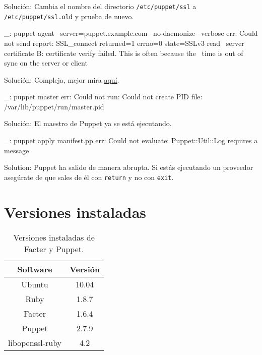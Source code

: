 Solución: Cambia el nombre del directorio \texttt{/etc/puppet/ssl} a \texttt{/etc/puppet/ssl.old} y prueba de nuevo.

\begin{bashcode}
_: puppet agent --server=puppet.example.com --no-daemonize --verbose
err: Could not send report: SSL_connect returned=1 errno=0 state=SSLv3 read \
server certificate B: certificate verify failed. This is often because the \
time is out of sync on the server or client
\end{bashcode}

Solución: Compleja, mejor mira \href{http://projects.puppetlabs.com/projects/1/wiki/Certificates_And_Security}{aquí}.

\begin{bashcode}
_: puppet master
err: Could not run: Could not create PID file: /var/lib/puppet/run/master.pid
\end{bashcode}

Solución: El maestro de Puppet ya se está ejecutando.

\begin{bashcode}
_: puppet apply manifest.pp
err: Could not evaluate: Puppet::Util::Log requires a message
\end{bashcode}

Solution: Puppet ha salido de manera abrupta. Si estás ejecutando un proveedor asegúrate de que sales de él con \texttt{return} y no con \texttt{exit}.


\section{Versiones instaladas}

\begin{table}[!htbp]
\centering
   \begin{tabular}{|c|c|}
      \hline
      \textbf{Software} & \textbf{Versión} \\ \hline
      Ubuntu & 10.04 \\ \hline
      Ruby   & 1.8.7 \\ \hline
      Facter & 1.6.4 \\ \hline
      Puppet & 2.7.9 \\ \hline
      libopenssl-ruby &	4.2 \\ \hline
   \end{tabular}
\caption{Versiones instaladas de Facter y Puppet.}
\label{table:puppet-versions}
\end{table}
